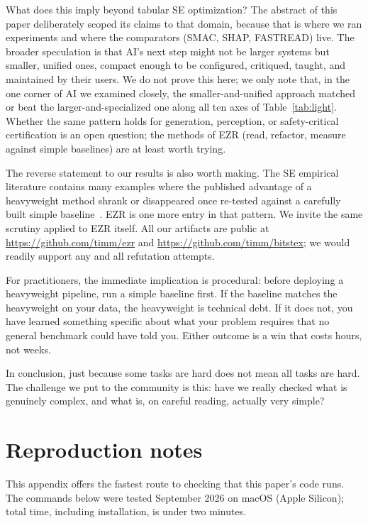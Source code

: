 \documentclass[AMA,STIX2COL]{WileyNJDv5}
\newcommand{\IT}{{\sffamily EZR}}
\begin{document}
What does this imply beyond tabular SE optimization? The
abstract of this paper deliberately scoped its claims to
that domain, because that is where we ran experiments and
where the comparators (SMAC, SHAP, FASTREAD) live. The
broader speculation is that AI's next step might not be
larger systems but smaller, unified ones, compact enough to
be configured, critiqued, taught, and maintained by their
users. We do not prove this here; we only note that, in the
one corner of AI we examined closely, the smaller-and-unified
approach matched or beat the larger-and-specialized one
along all ten axes of Table~\ref{tab:light}. Whether the
same pattern holds for generation, perception, or
safety-critical certification is an open question; the
methods of \IT{} (read, refactor, measure against simple
baselines) are at least worth trying.

The reverse statement to our results is also worth making.
The SE empirical literature contains many examples where the
published advantage of a heavyweight method shrank or
disappeared once re-tested against a carefully built simple
baseline~\cite{Fu17,fu2016tuning,agrawal2019dodge,Nair17a,
tantithamthavorn2016automated,grinsztajn2022why,Hou24}. \IT{}
is one more entry in that pattern. We invite the same scrutiny
applied to \IT{} itself. All our artifacts are public at
\url{https://github.com/timm/ezr} and
\url{https://github.com/timm/bitstex}; we would readily support any and all
refutation attempts.

For practitioners, the immediate implication is procedural:
before deploying a heavyweight pipeline, run a simple baseline
first. If the baseline matches the heavyweight on your data,
the heavyweight is technical debt. If it does not, you have
learned something specific about what your problem requires
that no general benchmark could have told you. Either outcome
is a win that costs hours, not weeks.

In conclusion, just because some tasks are hard does not mean
all tasks are hard. The challenge we put to the community is
this: have we really checked what is genuinely complex, and
what is, on careful reading, actually very simple?


\color{newblue}
\appendix

\section{Reproduction notes}\label{sec:repro}

This appendix offers the fastest route to checking that this
paper's code runs. The commands below were tested September
2026 on macOS (Apple Silicon); total time, including
installation, is under two minutes.
\end{document}
